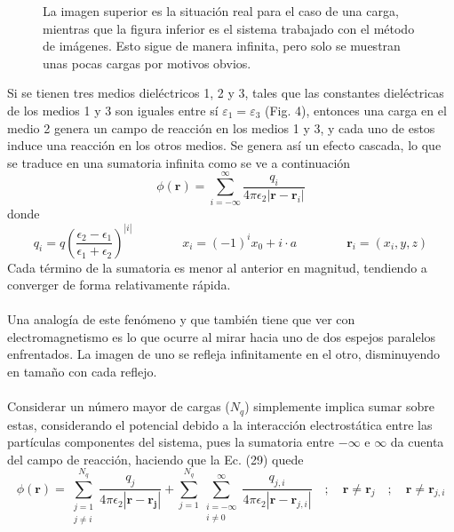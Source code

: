 \documentclass[12pt, oneside, numbers, spanish]{ezthesis}
\numberwithin{equation}{section}
\begin{document}
\begin{figure}[H]
\centering

\caption{La imagen superior es la situación real para el caso de una carga, mientras que la figura inferior es el sistema trabajado con el método de imágenes. Esto sigue de manera infinita, pero solo se muestran unas pocas cargas por motivos obvios.}
\label{Fig:Infty_Images}
\end{figure}

Si se tienen tres medios dieléctricos 1, 2 y 3, tales que las constantes dieléctricas de los medios 1 y 3 son iguales entre sí $\varepsilon_1 = \varepsilon_3$ (Fig. 4), entonces una carga en el medio 2 genera un campo de reacción en los medios 1 y 3, y cada uno de estos induce una reacción en los otros medios. Se genera así un efecto cascada, lo que se traduce en una sumatoria infinita \cite{Pei-kun} como se ve a continuación
\begin{equation}
\phi(\mathbf{r}) = \sum_{i=-\infty}^\infty\frac{q_i}{4\pi\epsilon_2|\mathbf{r} - \mathbf{r}_i|}
\end{equation}
donde
\begin{equation}
q_i = q\left(\frac{\epsilon_2 - \epsilon_1}{\epsilon_1 + \epsilon_2}\right)^{|i|} \qquad\qquad x_i=(-1)^ix_0 + i\cdot a \qquad\qquad \mathbf{r}_i=(x_i,y,z)
\end{equation}
Cada término de la sumatoria es menor al anterior en magnitud, tendiendo a converger de forma relativamente rápida.\\\\
Una analogía de este fenómeno y que también tiene que ver con electromagnetismo es lo que ocurre al mirar hacia uno de dos espejos paralelos enfrentados. La imagen de uno se refleja infinitamente en el otro, disminuyendo en tamaño con cada reflejo.\\\\
Considerar un número mayor de cargas ($N_q$) simplemente implica sumar sobre estas, considerando el potencial debido a la interacción electrostática entre las partículas componentes del sistema, pues la sumatoria entre $-\infty$ e $\infty$ da cuenta del campo de reacción, haciendo que la Ec. (29) quede
\begin{equation}
\phi(\mathbf{r}) = \sum_{\substack{j = 1\\j\neq i}}^{N_q} \frac{q_j}{4\pi\epsilon_2|\mathbf{r} - \mathbf{r_j}|} + \sum_{j=1}^{N_q}\sum_{\substack{i=-\infty\\i\neq 0}}^\infty\frac{q_{j,i}}{4\pi\epsilon_2|\mathbf{r} - \mathbf{r}_{j,i}|}\quad ; \quad \mathbf{r} \neq \mathbf{r}_j\quad ; \quad \mathbf{r} \neq \mathbf{r}_{j,i}
\end{equation}
\end{document}
